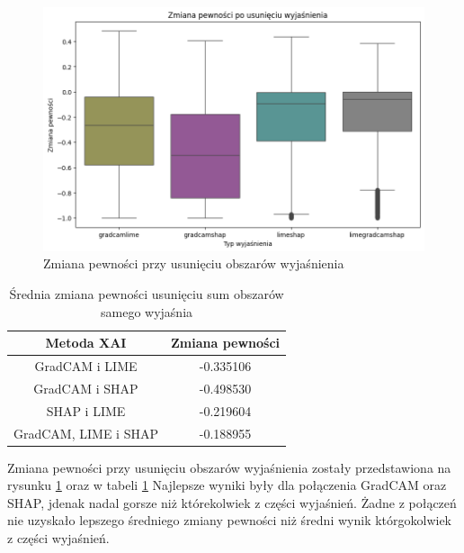 \begin{figure}[h]
	\centering\includegraphics[width=.9\textwidth]{img/combine_confidence_no_exp_and}
	\caption{Zmiana pewności przy usunięciu obszarów wyjaśnienia}  \label{rys:combineandconfidenceandno}
\end{figure}
\begin{table}
	\centering
	\begin{tabular}{|c|c|}
		\hline
		\textbf{Metoda XAI}  & Zmiana pewności \\
		\hline
		GradCAM i LIME       & -0.335106       \\
		\hline
		GradCAM i SHAP       & -0.498530       \\
		\hline
		SHAP i LIME          & -0.219604       \\
		\hline
		GradCAM, LIME i SHAP & -0.188955       \\
		\hline
	\end{tabular}
	\caption{Średnia zmiana pewności usunięciu sum obszarów samego wyjaśnia}
	\label{tab:combineandconfidenceandno}
\end{table}
Zmiana pewności przy usunięciu obszarów wyjaśnienia zostały przedstawiona na rysunku \ref{rys:combineandconfidenceandno} oraz w tabeli \ref{tab:combineandconfidenceandno}
Najlepsze wyniki były dla połączenia GradCAM oraz SHAP, jdenak nadal gorsze niż którekolwiek z części wyjaśnień.
Żadne z połączeń nie uzyskało lepszego średniego zmiany pewności niż średni wynik którgokolwiek z części wyjaśnień.


